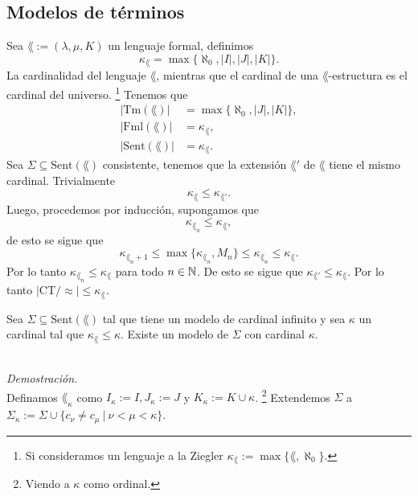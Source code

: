\subsection{Modelos de t\'erminos}
Sea $\lang := (\lambda, \mu, K)$ un lenguaje formal, definimos
\[ \kappa_\lang = \max \{ \aleph_0, |I|, |J|, |K| \}. \]
La cardinalidad del lenguaje $\lang$, mientras que el cardinal de una $\lang$-estructura es el cardinal del universo.
\footnote{Si consideramos un lenguaje a la Ziegler $\kappa_\lang := \max \{ \lang, \aleph_0 \}$.}
Tenemos que 
\begin{align*}
  |\mathrm{Tm} (\lang)| &= \max \{ \aleph_0, |J|, |K| \},\\
  |\mathrm{Fml} (\lang)| &= \kappa_\lang,\\
  |\mathrm{Sent} (\lang)| &= \kappa_\lang.
\end{align*}
Sea $\Sigma \subseteq \mathrm{Sent} (\lang)$ consistente, tenemos que la extensi\'on $\lang'$ de $\lang$ tiene el mismo cardinal.
Trivialmente
\[ \kappa_\lang \leq \kappa_{\lang'}. \]
Luego, procedemos por inducci\'on, supongamos que 
\[ \kappa_{\lang_n} \leq \kappa_\lang, \]
de esto se sigue que 
\[ \kappa_{\lang_n+1} \leq \max \{ \kappa_{\lang_n}, M_n \} \leq \kappa_{\lang_n} \leq \kappa_\lang.  \]
Por lo tanto $\kappa_{\lang_n} \leq \kappa_\lang$ para todo $n \in \mathbb{N}$.
De esto se sigue que $\kappa_{\lang'} \leq \kappa_\lang$.
Por lo tanto $|\mathrm{CT} / \approx| \leq \kappa_\lang$.
\begin{theorem}
  Sea $\Sigma \subseteq \mathrm{Sent} (\lang)$ tal que tiene un modelo de cardinal infinito y sea $\kappa$ un cardinal tal que $\kappa_\lang \leq \kappa$.
  Existe un modelo de $\Sigma$ con cardinal $\kappa$. 
\end{theorem}\\
\emph{Demostraci\'on.}\\
Definamos $\lang_\kappa$ como $I_\kappa := I, J_\kappa := J$ y $K_\kappa := K \cup \kappa$.
\footnote{Viendo a $\kappa$ como ordinal.}
Extendemos $\Sigma$ a $\Sigma_\kappa := \Sigma \cup \{ c_\nu \neq c_\mu \ | \ \nu < \mu < \kappa \}$. 

